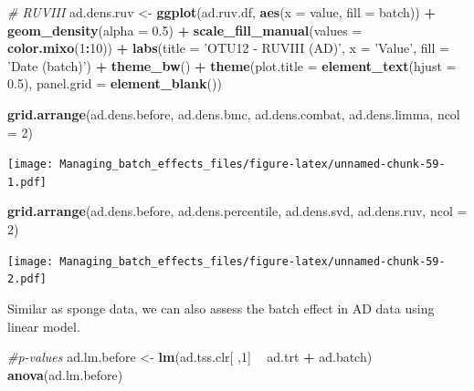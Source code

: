 \documentclass[]{book}
\newenvironment{Shaded}{\begin{snugshade}}{\end{snugshade}}
\newcommand{\KeywordTok}[1]{\textcolor[rgb]{0.13,0.29,0.53}{\textbf{#1}}}
\newcommand{\DataTypeTok}[1]{\textcolor[rgb]{0.13,0.29,0.53}{#1}}
\newcommand{\DecValTok}[1]{\textcolor[rgb]{0.00,0.00,0.81}{#1}}
\newcommand{\FloatTok}[1]{\textcolor[rgb]{0.00,0.00,0.81}{#1}}
\newcommand{\StringTok}[1]{\textcolor[rgb]{0.31,0.60,0.02}{#1}}
\newcommand{\CommentTok}[1]{\textcolor[rgb]{0.56,0.35,0.01}{\textit{#1}}}
\newcommand{\OperatorTok}[1]{\textcolor[rgb]{0.81,0.36,0.00}{\textbf{#1}}}
\newcommand{\NormalTok}[1]{#1}
\begin{document}
\begin{Shaded}
\begin{Highlighting}[]
\CommentTok{# RUVIII}
\NormalTok{ad.dens.ruv <-}\StringTok{ }\KeywordTok{ggplot}\NormalTok{(ad.ruv.df, }\KeywordTok{aes}\NormalTok{(}\DataTypeTok{x =}\NormalTok{ value, }\DataTypeTok{fill =}\NormalTok{ batch)) }\OperatorTok{+}\StringTok{ }
\StringTok{  }\KeywordTok{geom_density}\NormalTok{(}\DataTypeTok{alpha =} \FloatTok{0.5}\NormalTok{) }\OperatorTok{+}\StringTok{ }\KeywordTok{scale_fill_manual}\NormalTok{(}\DataTypeTok{values =} \KeywordTok{color.mixo}\NormalTok{(}\DecValTok{1}\OperatorTok{:}\DecValTok{10}\NormalTok{)) }\OperatorTok{+}\StringTok{ }
\StringTok{  }\KeywordTok{labs}\NormalTok{(}\DataTypeTok{title =} \StringTok{'OTU12 - RUVIII (AD)'}\NormalTok{, }\DataTypeTok{x =} \StringTok{'Value'}\NormalTok{, }\DataTypeTok{fill =} \StringTok{'Date (batch)'}\NormalTok{) }\OperatorTok{+}\StringTok{ }
\StringTok{  }\KeywordTok{theme_bw}\NormalTok{() }\OperatorTok{+}\StringTok{ }\KeywordTok{theme}\NormalTok{(}\DataTypeTok{plot.title =} \KeywordTok{element_text}\NormalTok{(}\DataTypeTok{hjust =} \FloatTok{0.5}\NormalTok{), }
                     \DataTypeTok{panel.grid =} \KeywordTok{element_blank}\NormalTok{())}
\end{Highlighting}
\end{Shaded}

\begin{Shaded}
\begin{Highlighting}[]
\KeywordTok{grid.arrange}\NormalTok{(ad.dens.before, ad.dens.bmc, }
\NormalTok{             ad.dens.combat, ad.dens.limma, }\DataTypeTok{ncol =} \DecValTok{2}\NormalTok{)}
\end{Highlighting}
\end{Shaded}

\texttt{[image: Managing\_batch\_effects\_files/figure-latex/unnamed-chunk-59-1.pdf]}

\begin{Shaded}
\begin{Highlighting}[]
\KeywordTok{grid.arrange}\NormalTok{(ad.dens.before, ad.dens.percentile, }
\NormalTok{             ad.dens.svd, ad.dens.ruv, }\DataTypeTok{ncol =} \DecValTok{2}\NormalTok{)}
\end{Highlighting}
\end{Shaded}

\texttt{[image: Managing\_batch\_effects\_files/figure-latex/unnamed-chunk-59-2.pdf]}

Similar as sponge data, we can also assess the batch effect in AD data
using linear model.

\begin{Shaded}
\begin{Highlighting}[]
\CommentTok{#p-values}
\NormalTok{ad.lm.before <-}\StringTok{ }\KeywordTok{lm}\NormalTok{(ad.tss.clr[ ,}\DecValTok{1}\NormalTok{] }\OperatorTok{~}\StringTok{ }\NormalTok{ad.trt }\OperatorTok{+}\StringTok{ }\NormalTok{ad.batch)}
\KeywordTok{anova}\NormalTok{(ad.lm.before)}
\end{Highlighting}
\end{Shaded}
\end{document}
